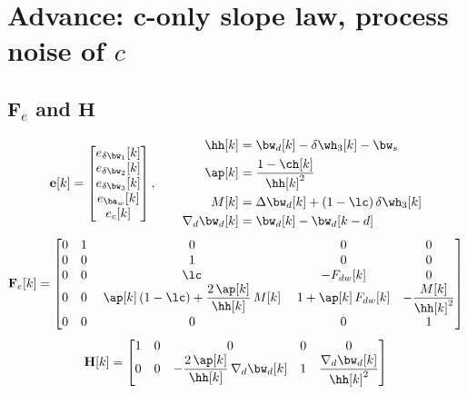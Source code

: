 \clearpage
\section{Advance: c-only slope law, process noise of $c$}

\subsection{$\mathbf{F}_e$ and $\mathbf{H}$}

\[
\mathbf{e}[k] = \begin{bmatrix} e_{\delta\bw_1}[k] \\ e_{\delta\bw_2}[k] \\ e_{\delta\bw_3}[k] \\ e_{\ba_w}[k] \\ e_c[k] \end{bmatrix},
\qquad
\begin{aligned}
\hh[k] &= \bw_d[k] - \delta\wh_3[k] - \bw_s \\
\ap[k] &= \frac{1 - \ch[k]}{\hh[k]^{2}} \\
M[k] &= \Delta\bw_d[k] + (1-\lc)\,\delta\wh_3[k] \\
\nabla_d\bw_d[k] &= \bw_d[k] - \bw_d[k-d]
\end{aligned}
\]
\[
\mathbf{F}_e[k] =
\begin{bmatrix}
0 & 1 & 0 & 0 & 0 \\
0 & 0 & 1 & 0 & 0 \\
0 & 0 & \lc & -F_{dw}[k] & 0 \\
0 & 0 & \;\ap[k]\,(1-\lc) + \dfrac{2\,\ap[k]}{\hh[k]}\,M[k]\; & 1 + \ap[k]\,F_{dw}[k] & -\dfrac{M[k]}{\hh[k]^{2}} \\
0 & 0 & 0 & 0 & 1
\end{bmatrix}
\]
\[
\mathbf{H}[k] =
\begin{bmatrix}
1 & 0 & 0 & 0 & 0 \\
0 & 0 & -\dfrac{2\,\ap[k]}{\hh[k]}\,\nabla_d\bw_d[k] & 1 & \dfrac{\nabla_d\bw_d[k]}{\hh[k]^{2}}
\end{bmatrix}
\]

